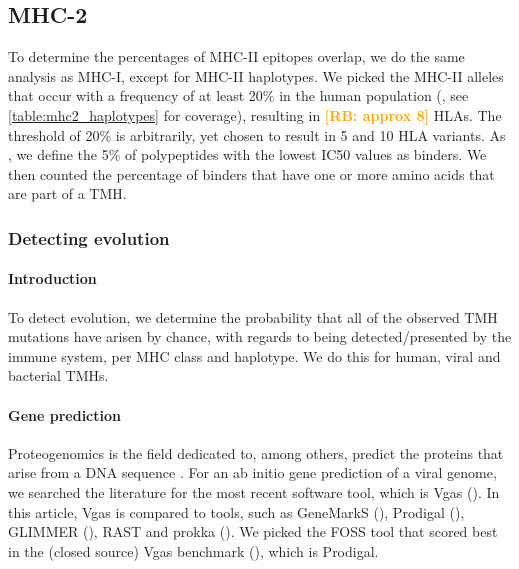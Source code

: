 \documentclass{article}
\newcommand{\richel}[1]{\textcolor{orange}{\textbf{[RB: #1]}}}
\begin{document}
\subsection{MHC-2}

To determine the percentages of MHC-II epitopes overlap, 
we do the same analysis as MHC-I, except for
MHC-II haplotypes. We picked the MHC-II alleles
that occur with a frequency of at least 20\% in
the human population (\cite{greenbaum2011functional},
see \ref{table:mhc2_haplotypes} for coverage),
resulting in \richel{approx 8} HLAs.
The threshold of 20\% is arbitrarily, yet chosen to result in 5 and 10 HLA variants.  
As \cite{bianchi2017}, we define the 5\% of polypeptides 
with the lowest IC50 values as binders. We then counted the percentage
of binders that have one or more amino acids that are part of a TMH.

\subsubsection{Detecting evolution}

\paragraph{Introduction}

To detect evolution, we determine the probability 
that all of the observed TMH mutations have arisen by chance,
with regards to being detected/presented by the immune system,
per MHC class and haplotype. We do this for human, viral and
bacterial TMHs.

\paragraph{Gene prediction}

Proteogenomics is the field dedicated to, among others,
predict the proteins that arise from a DNA 
sequence \cite{nesvizhskii2014proteogenomics}.
For an ab initio gene prediction of a viral genome, 
we searched the literature for the most recent software tool,
which is Vgas (\cite{zhang2019vgas}). In this article, 
Vgas is compared to tools, such as GeneMarkS (\cite{besemer2001genemarks}),
Prodigal (\cite{hyatt2012gene}), GLIMMER (\cite{delcher1999improved}),
RAST \cite{aziz2008rast} and prokka (\cite{seemann2014prokka}).
We picked the FOSS tool that scored best in the (closed source) Vgas
benchmark (\cite{zhang2019vgas}), which is Prodigal.
\end{document}
